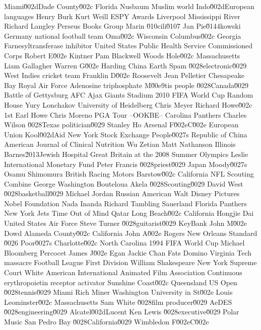 Miami\u002dDade County\u002c Florida  Nusbaum  Muslim world  
Indo\u002dEuropean languages  Henry Burk  Kurt Weill  
ESPY Awards  Liverpool  Mississippi River  
Richard Langley  Perseus Books Group  Marin \u010cili\u0107  
Jan Pie\u0144kowski  Germany national football team  Oma\u002c Wisconsin  
Columbus\u002c Georgia  Farnesyltransferase inhibitor  United States Public Health Service Commissioned Corps  
Robert E\u002e Kintner  Pam Blackwell  Woods Hole\u002c Massachusetts  
Liam Gallagher  Warren G\u002e Harding  China  
Earth  Spam \u0028electronic\u0029  West Indies cricket team  
Franklin D\u002e Roosevelt  Jean Pelletier  Chesapeake Bay  
Royal Air Force  Adenosine triphosphate  M\u00e9tis people \u0028Canada\u0029  
Battle of Gettysburg  AFC Ajax  Giants Stadium  
2010 FIFA World Cup  Random House  Yury Lonchakov  
University of Heidelberg  Chris Meyer  Richard Howe\u002c 1st Earl Howe  
Chris Moreno  PGA Tour  --OOKBE--  
Carolina Panthers  Charles Wilson \u0028Texas politician\u0029  Stanley Ho  
Arsenal F\u002eC\u002e  European Union  Kool\u002dAid  
New York Stock Exchange  People\u0027s Republic of China  American Journal of Clinical Nutrition  
Wu Zetian  Matt Nathanson  Illinois  
Barnes\u2013Jewish Hospital  Great Britain at the 2008 Summer Olympics  Leslie  
International Monetary Fund  Peter Francis \u0028priest\u0029  Japan  
Moody\u0027s  Osamu Shimomura  British Racing Motors  
Barstow\u002c California  NFL Scouting Combine  George Washington  
Bouteloua  Akela \u0028Scouting\u0029  David West \u0028basketball\u0029  
Michael Jordan  Russian American  Walt Disney Pictures  
Nobel Foundation  Nada Inanda  Richard Tambling  
Sauerland  Florida Panthers  New York Jets  
Time Out of Mind  Qatar  Long Beach\u002c California  
Hongjie Dai  United States Air Force  Steve Turner \u0028guitarist\u0029  
KeyBank  John M\u002e Dowd  Alameda County\u002c California  
John A\u002e Rogers  New Orleans  Standard \u0026 Poor\u0027s  
Charlotte\u002c North Carolina  1994 FIFA World Cup  Michael Bloomberg  
Percocet  James J\u002e Egan  Jackie Chan  
Fats Domino  Virginia Tech massacre  Football League First Division  
William Shakespeare  New York Supreme Court  White American  
International Animated Film Association  Continuous erythropoietin receptor activator  Sunshine Coast\u002c Queensland  
US Open \u0028tennis\u0029  Miami  Rich Miner  
Washington University in St\u002e Louis  Leominster\u002c Massachusetts  Sam White \u0028film producer\u0029  
AeDES \u0028engineering\u0029  Alcatel\u002dLucent  Ken Lewis \u0028executive\u0029  
Polar Music  San Pedro Bay \u0028California\u0029  Wimbledon F\u002eC\u002e  
